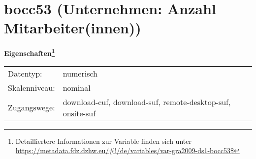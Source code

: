 
    \setcounter{footnote}{0}

    \vspace*{-1.8cm}
	\section{bocc53 (Unternehmen: Anzahl Mitarbeiter(innen))}
	\label{section:bocc53}



    \vspace*{0.5cm}
    \noindent\textbf{Eigenschaften\footnote{Detailliertere Informationen zur Variable finden sich unter
		\url{https://metadata.fdz.dzhw.eu/\#!/de/variables/var-gra2009-ds1-bocc53$}}}\\
	\begin{tabularx}{\hsize}{@{}lX}
	Datentyp: & numerisch \\
	Skalenniveau: & nominal \\
	Zugangswege: &
	  download-cuf, 
	  download-suf, 
	  remote-desktop-suf, 
	  onsite-suf
 \\
    \end{tabularx}



